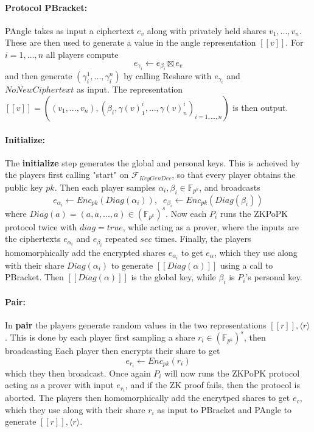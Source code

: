 \documentclass{article}
\begin{document}
\paragraph{Protocol PBracket:}
PAngle takes as input a ciphertext $e_v$ along with privately held shares $v_1, ..., v_n$. These are then used to generate a value in the angle representation $[\![ v ]\!]$.
For $i = 1, ..., n$ all players compute $$e_{\gamma_i} \leftarrow e_{\beta_i} \boxtimes e_v$$ and then generate $(\gamma^1_i, ..., \gamma^n_i)$ by calling Reshare with $e_{\gamma_i}$ and $NoNewCiphertext$ as input.
The representation $[\![ v ]\!] = ((v_1, ..., v_n), (\beta_i, \gamma(v)^i_1, ..., \gamma(v)^i_n)_{i = 1, ..., n})$ is then output.

\paragraph{Initialize:}
The \textbf{initialize} step generates the global and personal keys. This is acheived by the players first calling "start" on $\mathcal{F}_{KeyGenDec}$, so that every player obtains the public key $pk$.
Then each player samples $\alpha_i, \beta_i \in \mathbb{F}_{p^k}$, and broadcasts $$e_{\alpha_i} \leftarrow Enc_{pk}(Diag(\alpha_i)), \;\; e_{\beta_i} \leftarrow Enc_{pk}(Diag(\beta_i))$$ where $Diag(a) = (a, a, ..., a) \in (\mathbb{F}_{p^k})^s$. Now each $P_i$ runs the ZKPoPK protocol twice with $diag = true$, while acting as a prover, where the inputs are the ciphertexts $e_{\alpha_i}$ and $e_{\beta_i}$ repeated $sec$ times.
Finally, the players homomorphically add the encrypted shares $e_{\alpha_i}$ to get $e_\alpha$, which they use along with their share $Diag(\alpha_i)$ to generate $[\![ Diag(\alpha) ]\!]$ using a call to PBracket. Then $[\![ Diag(\alpha) ]\!]$ is the global key, while $\beta_i$ is $P_i$'s personal key.

\paragraph{Pair:}
In \textbf{pair} the players generate random values in the two representations $[\![ r ]\!], \langle r \rangle$. This is done by each player first sampling a share $r_i \in (\mathbb{F}_{p^k})^s$, then broadcasting Each player then encrypts their share to get $$e_{r_i} \leftarrow Enc_{pk}(r_i)$$ which they then broadcast. Once again $P_i$ will now runs the ZKPoPK protocol acting as a prover with input $e_{r_i}$, and if the ZK proof fails, then the protocol is aborted.
The players then homomorphically add the encrytped shares to get $e_r$, which they use along with their share $r_i$ as input to PBracket and PAngle to generate $[\![ r ]\!], \langle r \rangle$.
\end{document}
